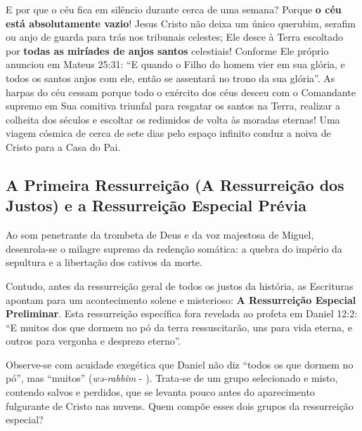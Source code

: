 \documentclass[11pt,a4paper,openany]{book}
\begin{document}
E por que o céu fica em silêncio durante cerca de uma semana?
Porque \textbf{o céu está absolutamente vazio}!
Jesus Cristo não deixa um único querubim, serafim ou anjo de guarda para trás nos tribunais celestes; Ele desce à Terra escoltado por \textbf{todas as miríades de anjos santos} celestiais! Conforme Ele próprio anunciou em Mateus 25:31: ``E quando o Filho do homem vier em sua glória, e todos os santos anjos com ele, então se assentará no trono da sua glória''.
As harpas do céu cessam porque todo o exército dos céus desceu com o Comandante supremo em Sua comitiva triunfal para resgatar os santos na Terra, realizar a colheita dos séculos e escoltar os redimidos de volta às moradas eternas! Uma viagem cósmica de cerca de sete dias pelo espaço infinito conduz a noiva de Cristo para a Casa do Pai.



\subsection{A Primeira Ressurreição (A Ressurreição dos Justos) e a Ressurreição Especial Prévia}


Ao som penetrante da trombeta de Deus e da voz majestosa de Miguel, desenrola-se o milagre supremo da redenção somática: a quebra do império da sepultura e a libertação dos cativos da morte.

Contudo, antes da ressurreição geral de todos os justos da história, as Escrituras apontam para um acontecimento solene e misterioso: \textbf{A Ressurreição Especial Preliminar}.
Esta ressurreição específica fora revelada ao profeta em Daniel 12:2:
``E muitos dos que dormem no pó da terra ressuscitarão, uns para vida eterna, e outros para vergonha e desprezo eterno''.

Observe-se com acuidade exegética que Daniel não diz ``todos os que dormem no pó'', mas ``muitos'' (\textit{wə-rabbîm} - ). Trata-se de um grupo selecionado e misto, contendo salvos e perdidos, que se levanta pouco antes do aparecimento fulgurante de Cristo nas nuvens. Quem compõe esses dois grupos da ressurreição especial?
\end{document}
